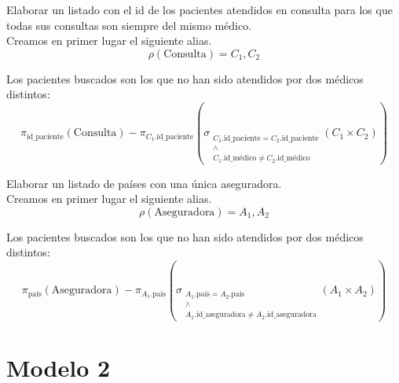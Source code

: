 \documentclass[12pt]{article}
\begin{document}
\begin{ejercicio}[AR]
    Elaborar un listado con el id de los pacientes atendidos en consulta para los que todas sus consultas son siempre del mismo médico.\\

    Creamos en primer lugar el siguiente alias.
    \begin{equation*}
        \rho(\text{Consulta})=C_1,C_2
    \end{equation*}

    Los pacientes buscados son los que no han sido atendidos por dos médicos distintos:
    \begin{equation*}
        \pi_{\text{id\_paciente}}(\text{Consulta})
        - \pi_{C_1.\text{id\_paciente}}\left(\sigma_{\substack{C_1.\text{id\_paciente}=C_2.\text{id\_paciente}\\\land \\ C_1.\text{id\_médico}\neq C_2.\text{id\_médico}}}(C_1\times C_2)\right)
    \end{equation*}
\end{ejercicio}

\begin{ejercicio}[AR]
    Elaborar un listado de países con una única aseguradora.\\
    Creamos en primer lugar el siguiente alias.
    \begin{equation*}
        \rho(\text{Aseguradora})=A_1,A_2
    \end{equation*}

    Los pacientes buscados son los que no han sido atendidos por dos médicos distintos:
    \begin{equation*}
        \pi_{\text{país}}(\text{Aseguradora})
        - \pi_{A_1.\text{país}}\left(\sigma_{\substack{A_1.\text{país}=A_2.\text{país}\\\land \\ A_1.\text{id\_aseguradora}\neq A_2.\text{id\_aseguradora}}}(A_1\times A_2)\right)
    \end{equation*}
\end{ejercicio}


\newpage
\section{Modelo 2}\label{sec:modelo2}
\end{document}
